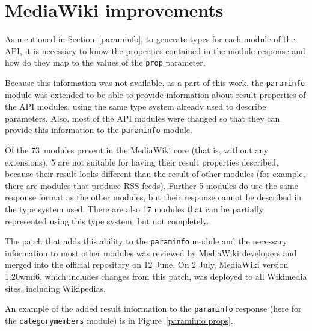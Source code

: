 \chapter{MediaWiki improvements}
\label{mw improvements}

As mentioned in Section~\ref{paraminfo}, to generate types for each module of the API,
it is necessary to know the properties contained in the module response
and how do they map to the values of the \texttt{prop} parameter.

Because this information was not available, as a part of this work,
the \texttt{paraminfo} module was extended to be able to provide information about result properties
of the API modules, using the same type system already used to describe parameters.
Also, most of the API modules were changed so that they can provide this information to the \texttt{paraminfo} module.

Of the 73~modules present in the MediaWiki core (that is, without any extensions),
5 are not suitable for having their result properties described,
because their result looks different than the result of other modules (for example, there are modules that produce RSS feeds).
Further 5 modules do use the same response format as the other modules,
but their response cannot be described in the type system used.
There are also 17 modules that can be partially represented using this type system, but not completely.

The patch that adds this ability to the \texttt{paraminfo} module and the necessary
information to most other modules was reviewed by MediaWiki developers and merged into the official repository
on 12 June.
On 2 July, MediaWiki version 1.20wmf6, which includes changes from this patch, was deployed to all Wikimedia sites, including Wikipedias.

An example of the added result information to the \texttt{paraminfo} response (here for the \texttt{categorymembers} module) is in Figure~\ref{paraminfo props}.

\medskip

